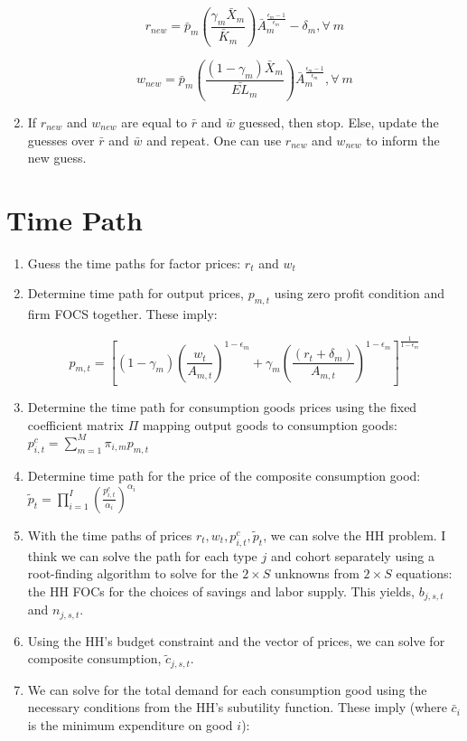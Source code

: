 \documentclass[letterpaper,12pt]{article}
\theoremstyle{definition}
\begin{document}
\begin{spacing}{1.5}
\begin{enumerate}
	\begin{equation}
	r_{new} = \bar{p}_{m}\left(\frac{\gamma_{m}\bar{X}_{m}}{\bar{K}_{m}}\right)\bar{A}_{m}^{\frac{\epsilon_{m}-1}{\epsilon_{m}}}-\delta_{m}, \forall \ m
	\end{equation}

	\begin{equation}
	w_{new} = \bar{p}_{m}\left(\frac{(1-\gamma_{m})\bar{X}_{m}}{\bar{EL}_{m}}\right)\bar{A}_{m}^{\frac{\epsilon_{m}-1}{\epsilon_{m}}}, \forall \ m
	\end{equation}

\item If $r_{new}$ and $w_{new}$ are equal to $\bar{r}$ and $\bar{w}$ guessed, then stop.  Else, update the guesses over $\bar{r}$ and $\bar{w}$ and repeat.  One can use $r_{new}$ and $w_{new}$ to inform the new guess.

\end{enumerate}



\section{Time Path}

\begin{enumerate}
\item Guess the time paths for factor prices: $r_{t}$ and $w_{t}$
\item Determine time path for output prices, $p_{m,t}$ using zero profit condition and firm FOCS together. These imply:

\begin{equation}
p_{m,t}  = \left[(1-\gamma_{m})\left(\frac{w_{t}}{A_{m,t}}\right)^{1-\epsilon_{m}} + \gamma_{m}\left(\frac{(r_{t}+\delta_{m})}{A_{m,t}}\right)^{1-\epsilon_{m}} \right]^{\frac{1}{1-\epsilon_{m}}}
\end{equation}
\item Determine the time path for consumption goods prices using the fixed coefficient matrix $\Pi$ mapping output goods to consumption goods: $p^{c}_{i,t} = \sum_{m=1}^{M}\pi_{i,m}p_{m,t}$
\item Determine time path for the price of the composite consumption good: $\tilde{p}_{t} =  \prod_{i=1}^{I}\left( \frac{p^{c}_{i,t}}{\alpha_{i}} \right)^{\alpha_{i}}$
\item With the time paths of prices $r_{t}, w_{t}, p^{c}_{i,t}, \tilde{p}_{t}$, we can solve the HH problem.  I think we can solve the path for each type $j$ and cohort separately using a root-finding algorithm to solve for the $2\times S$ unknowns from $2\times S$ equations: the HH FOCs for the choices of savings and labor supply.  This yields, $b_{j,s,t}$ and $n_{j,s,t}$.
\item Using the HH's budget constraint and the vector of prices, we can solve for composite consumption, $\tilde{c}_{j,s,t}$.
\item We can solve for the total demand for each consumption good using the necessary conditions from the HH's subutility function.  These imply (where $\bar{c}_{i}$ is the minimum expenditure on good $i$): 


\end{enumerate}
\end{spacing}
\end{document}
